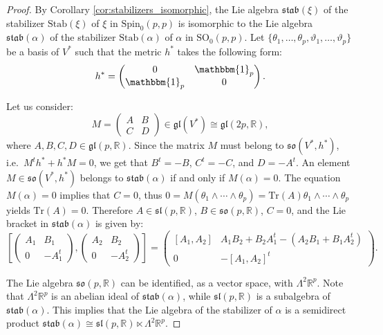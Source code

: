 \documentclass[10pt,reqno]{amsart}
\theoremstyle{definition}
\theoremstyle{remark}
\newcommand{\R}{\mathbb{R}}
\newcommand{\Tr}{\mathrm{Tr}}
\begin{document}
\begin{proof}
    By Corollary \ref{cor:stabilizers_isomorphic}, the Lie algebra $\mathfrak{stab}(\xi)$ of the stabilizer $\mathrm{Stab}(\xi)$ of $\xi$ in $\mathrm{Spin}_0(p,p)$ is isomorphic to the Lie algebra $\mathfrak{stab}(\alpha)$ of the stabilizer $\mathrm{Stab}(\alpha)$ of $\alpha$ in $\mathrm{SO}_0(p,p)$. Let $\{\theta_1,\ldots,\theta_p,\vartheta_1,\ldots,\vartheta_p\}$ be a basis of $V^*$ such that the metric $h^*$ takes the following form: $$h^*=\begin{pmatrix}
        0&\mathbbm{1}_p\\
        \mathbbm{1}_p&0
    \end{pmatrix}.$$
    
    Let us consider: $$M=\begin{pmatrix}
        A&B\\
        C&D
    \end{pmatrix}\in\mathfrak{gl}(V^*)\cong\mathfrak{gl}(2p,\R),$$ where $A,B,C,D\in\mathfrak{gl}(p,\R)$. Since the matrix $M$ must belong to $\mathfrak{so}(V^*,h^*)$, i.e.\ $M^th^*+h^*M=0$, we get that $B^t=-B$, $C^t=-C$, and $D=-A^t$. An element $M\in\mathfrak{so}(V^*,h^*)$ belongs to $\mathfrak{stab}(\alpha)$ if and only if $M(\alpha)=0$. The equation $M(\alpha)=0$ implies that $C=0$, thus $0=M(\theta_1\wedge\cdots\wedge\theta_p)=\Tr(A)\theta_1\wedge\cdots\wedge\theta_p$ yields $\Tr(A)=0$. Therefore $A\in\mathfrak{sl}(p,\R)$, $B\in\mathfrak{so}(p,\R)$, $C=0$, and the Lie bracket in $\mathfrak{stab}(\alpha)$ is given by: $$\left[\begin{pmatrix}
        A_1&B_1\\
        0&-A_1^t
    \end{pmatrix},\begin{pmatrix}
        A_2&B_2\\
        0&-A_2^t
    \end{pmatrix}\right]=\begin{pmatrix}
        [A_1,A_2]&A_1B_2+B_2A_1^t-(A_2B_1+B_1A_2^t)\\
        0&-[A_1,A_2]^t
    \end{pmatrix}.$$
    
    The Lie algebra $\mathfrak{so}(p,\R)$ can be identified, as a vector space, with $\Lambda^2\R^p$. Note that $\Lambda^2\R^p$ is an abelian ideal of $\mathfrak{stab}(\alpha)$, while $\mathfrak{sl}(p,\R)$ is a subalgebra of $\mathfrak{stab}(\alpha)$. This implies that the Lie algebra of the stabilizer of $\alpha$ is a semidirect product $\mathfrak{stab}(\alpha)\cong\mathfrak{sl}(p,\R)\ltimes\Lambda^2\R^p$.
\end{proof}
\end{document}
